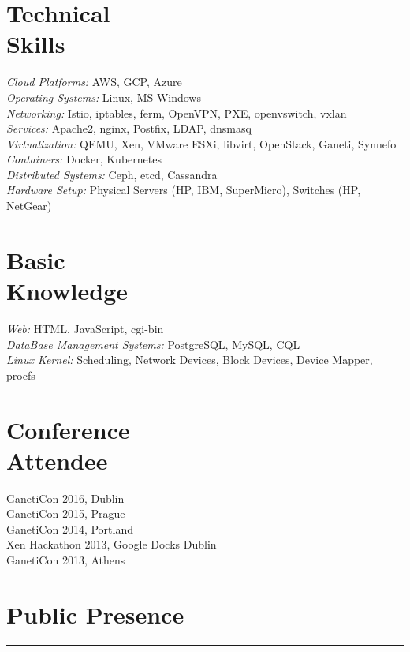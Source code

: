 \documentclass[margin,centered]{res}
\begin{document}
\begin{resume}
\section{\sc Technical\\Skills}
\textit{Cloud Platforms:} AWS, GCP, Azure \\
\textit{Operating Systems:} Linux, MS Windows \\
\textit{Networking:} Istio, iptables, ferm, OpenVPN, PXE, openvswitch, vxlan\\
\textit{Services:} Apache2, nginx, Postfix, LDAP, dnsmasq\\
\textit{Virtualization:} QEMU, Xen, VMware ESXi, libvirt, OpenStack, Ganeti, Synnefo\\
\textit{Containers:} Docker, Kubernetes\\
\textit{Distributed Systems:} Ceph, etcd, Cassandra\\
\textit{Hardware Setup:} Physical Servers (HP, IBM, SuperMicro), Switches (HP, NetGear) \\

\section{\sc Basic\\Knowledge}
\textit{Web:} HTML, JavaScript, cgi-bin \\
\textit{DataBase Management Systems:} PostgreSQL, MySQL, CQL \\
\textit{Linux Kernel:} Scheduling, Network Devices, Block Devices, Device Mapper, procfs

\section{\sc Conference\\Attendee}
GanetiCon 2016, Dublin\\
GanetiCon 2015, Prague\\
GanetiCon 2014, Portland\\
Xen Hackathon 2013, Google Docks Dublin\\
GanetiCon 2013, Athens

\section{Public Presence}
\rule[3pt]{\textwidth}{0.4pt}


\end{resume}
\end{document}
